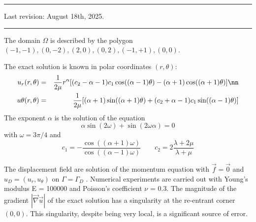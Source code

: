 \par\noindent\rule{\textwidth}{0.4pt}

Last revision: August 18th, 2025.

\par\noindent\rule{\textwidth}{0.4pt}




The domain
$\Omega$ is described by the polygon
$(-1,-1), (0,-2), (2, 0), (0, 2), (-1,+1), (0, 0)$.

The exact solution is known in polar coordinates $(r,\theta)$:
\begin{eqnarray}
u_r(r,\theta)
&=&\frac{1}{2\mu} r^\alpha 
[(c_2 - \alpha - 1)c_1 \cos((\alpha - 1)\theta) 
- (\alpha + 1) \cos((\alpha + 1)\theta)] \nn\\
u\theta(r,\theta)&=& 
\frac{1}{2\mu}
[(\alpha + 1) \sin((\alpha + 1)\theta) 
+ (c_2 + \alpha - 1)c_1 \sin((\alpha - 1)\theta)]
\end{eqnarray}
The exponent $\alpha$ is the solution of the equation
\[
\alpha \sin(2\omega) + \sin(2\omega \alpha ) = 0
\]
with $\omega=3\pi/4$ and
\[
c_1 = -\frac{\cos((\alpha+1)\omega)}{\cos((\alpha-1)\omega)}
\qquad
c_2 = 2 \frac{\lambda + 2\mu}{\lambda+\mu}
\]


The displacement field are solution of the momentum equation 
with $\vec{f} = \vec{0}$ and $u_D = (u_r , u_\theta )$ on 
$\Gamma = \Gamma_D$ . Numerical
experiments are carried out with Young’s modulus E = 100000 and Poisson’s coefficient $\nu$ = 0.3. The magnitude of
the gradient $|\vec\nabla \vec{u}|$ of the exact solution 
has a singularity at the re-entrant corner $(0,0)$. This singularity,
despite being very local, is a significant source of error.



